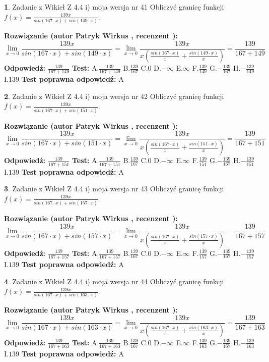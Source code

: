 \documentclass[12pt, a4paper]{article}
\theoremstyle{definition} %
\newtheorem{zad}{}
\newcommand{\zadStart}[1]{\begin{zad}#1\newline}
\newcommand{\zadStop}{\end{zad}}
\newcommand{\rozwStart}[2]{\noindent \textbf{Rozwiązanie (autor #1 , recenzent #2): }\newline}
\newcommand{\rozwStop}{\newline}
\newcommand{\odpStart}{\noindent \textbf{Odpowiedź:}\newline}
\newcommand{\odpStop}{\newline}
\newcommand{\testStart}{\noindent \textbf{Test:}\newline}
\newcommand{\testStop}{\newline}
\newcommand{\kluczStart}{\noindent \textbf{Test poprawna odpowiedź:}\newline}
\newcommand{\kluczStop}{\newline}
\begin{document}
\zadStart{Zadanie z Wikieł Z 4.4 i) moja wersja nr 41}
Obliczyć granicę funkcji $f(x)=\frac{139x}{sin(167\cdot x) +sin(149\cdot x)}$.
\zadStop
\rozwStart{Patryk Wirkus}{}
$$\lim\limits_{x\to 0}\frac{139x}{sin(167\cdot x) +sin(149\cdot x)}=\lim\limits_{x\to 0}\frac{139x}{x(\frac{sin(167\cdot x)}{x}+\frac{sin(149\cdot x)}{x})}=\frac{139}{167+149}$$
\rozwStop
\odpStart
$\frac{139}{167+149}$
\odpStop
\testStart
A.$\frac{139}{167+149}$
B.$\frac{139}{167}$
C.$0$
D.$-\infty$
E.$\infty$
F.$\frac{139}{149}$
G.$-\frac{139}{167}$
H.$-\frac{139}{149}$
I.$139$
\testStop
\kluczStart
A
\kluczStop



\zadStart{Zadanie z Wikieł Z 4.4 i) moja wersja nr 42}
Obliczyć granicę funkcji $f(x)=\frac{139x}{sin(167\cdot x) +sin(151\cdot x)}$.
\zadStop
\rozwStart{Patryk Wirkus}{}
$$\lim\limits_{x\to 0}\frac{139x}{sin(167\cdot x) +sin(151\cdot x)}=\lim\limits_{x\to 0}\frac{139x}{x(\frac{sin(167\cdot x)}{x}+\frac{sin(151\cdot x)}{x})}=\frac{139}{167+151}$$
\rozwStop
\odpStart
$\frac{139}{167+151}$
\odpStop
\testStart
A.$\frac{139}{167+151}$
B.$\frac{139}{167}$
C.$0$
D.$-\infty$
E.$\infty$
F.$\frac{139}{151}$
G.$-\frac{139}{167}$
H.$-\frac{139}{151}$
I.$139$
\testStop
\kluczStart
A
\kluczStop



\zadStart{Zadanie z Wikieł Z 4.4 i) moja wersja nr 43}
Obliczyć granicę funkcji $f(x)=\frac{139x}{sin(167\cdot x) +sin(157\cdot x)}$.
\zadStop
\rozwStart{Patryk Wirkus}{}
$$\lim\limits_{x\to 0}\frac{139x}{sin(167\cdot x) +sin(157\cdot x)}=\lim\limits_{x\to 0}\frac{139x}{x(\frac{sin(167\cdot x)}{x}+\frac{sin(157\cdot x)}{x})}=\frac{139}{167+157}$$
\rozwStop
\odpStart
$\frac{139}{167+157}$
\odpStop
\testStart
A.$\frac{139}{167+157}$
B.$\frac{139}{167}$
C.$0$
D.$-\infty$
E.$\infty$
F.$\frac{139}{157}$
G.$-\frac{139}{167}$
H.$-\frac{139}{157}$
I.$139$
\testStop
\kluczStart
A
\kluczStop



\zadStart{Zadanie z Wikieł Z 4.4 i) moja wersja nr 44}
Obliczyć granicę funkcji $f(x)=\frac{139x}{sin(167\cdot x) +sin(163\cdot x)}$.
\zadStop
\rozwStart{Patryk Wirkus}{}
$$\lim\limits_{x\to 0}\frac{139x}{sin(167\cdot x) +sin(163\cdot x)}=\lim\limits_{x\to 0}\frac{139x}{x(\frac{sin(167\cdot x)}{x}+\frac{sin(163\cdot x)}{x})}=\frac{139}{167+163}$$
\rozwStop
\odpStart
$\frac{139}{167+163}$
\odpStop
\testStart
A.$\frac{139}{167+163}$
B.$\frac{139}{167}$
C.$0$
D.$-\infty$
E.$\infty$
F.$\frac{139}{163}$
G.$-\frac{139}{167}$
H.$-\frac{139}{163}$
I.$139$
\testStop
\kluczStart
A
\kluczStop
\end{document}
